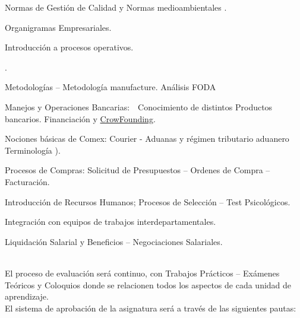 \newpage
\vspace*{12pt}
\hspace*{18pt}

\begin{guiones}
  \item Normas de Gestión de Calidad  y Normas medioambientales .
  \item Organigramas Empresariales.
  \item Introducción a procesos operativos.
  \item {}.
  \item Metodologías  – Metodología  manufacture. Análisis FODA
  \item Manejos y Operaciones Bancarias:\ \ Conocimiento de distintos Productos bancarios.
        Financiación y \underline{CrowFounding}.
  \item Nociones básicas de Comex: Courier - Aduanas y régimen tributario aduanero
        Terminología ).
  \item Procesos de Compras: Solicitud de Presupuestos – Ordenes de Compra – Facturación.
\end{guiones}

\vspace{22pt}

\begin{guiones}
  \item Introducción de Recursos Humanos; Procesos de Selección – Test Psicológicos.\\
  \item Integración con equipos de trabajos interdepartamentales.
  \item Liquidación Salarial y Beneficios – Negociaciones Salariales.
\end{guiones}

\vspace{22pt}
\\
El proceso de evaluación será continuo, con Trabajos Prácticos – Exámenes Teóricos y
Coloquios donde se relacionen todos los aspectos de cada unidad de aprendizaje.\\
El sistema de aprobación de la asignatura será a través de las siguientes pautas:


